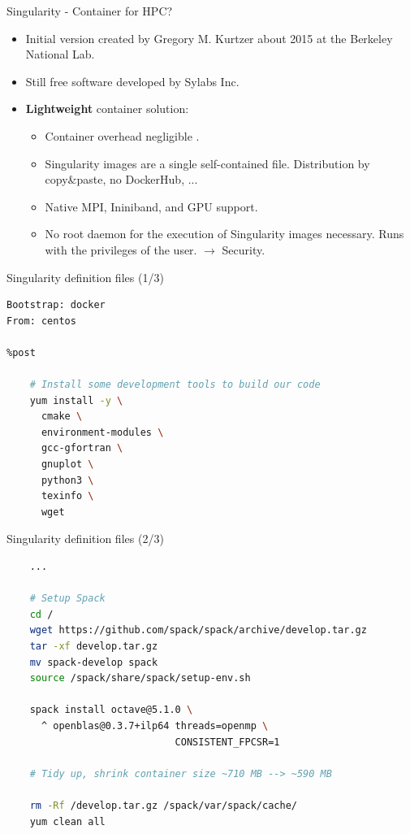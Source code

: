 \documentclass[xcolor=svgnames,xcolor=table,aspectratio=169]{beamer}
\begin{document}
\begin{frame}{Singularity \cite{Kurtzer2017} - Container for HPC?}
\begin{itemize}
\itemsep1em
\item
Initial version created by Gregory M. Kurtzer about 2015
at the Berkeley National Lab.

\item
Still free software developed by Sylabs Inc.

\item
\textbf{Lightweight} container solution:

\begin{itemize}
\itemsep1em
\item
Container overhead negligible
\cite{Herbein2016,Le2017,Younge2017,Shudler2019}.

\item
Singularity images are a single self-contained file.
Distribution by copy\&paste, no DockerHub, ...

\item
Native MPI, Ininiband, and GPU support.

\item
No root daemon for the execution of Singularity images necessary.
Runs with the privileges of the user.
$\rightarrow$ Security.
\end{itemize}
\end{itemize}
\end{frame}



\begin{frame}[fragile]{Singularity definition files (1/3)}
\begin{lstlisting}[xleftmargin=5em,language=Bash]
Bootstrap: docker
From: centos

%post

    # Install some development tools to build our code
    yum install -y \
      cmake \
      environment-modules \
      gcc-gfortran \
      gnuplot \
      python3 \
      texinfo \
      wget
\end{lstlisting}
\end{frame}



\begin{frame}[fragile]{Singularity definition files (2/3)}
\begin{lstlisting}[xleftmargin=5em,language=Bash]
%post
    ...

    # Setup Spack
    cd /
    wget https://github.com/spack/spack/archive/develop.tar.gz
    tar -xf develop.tar.gz
    mv spack-develop spack
    source /spack/share/spack/setup-env.sh

    spack install octave@5.1.0 \
      ^ openblas@0.3.7+ilp64 threads=openmp \
                             CONSISTENT_FPCSR=1

    # Tidy up, shrink container size ~710 MB --> ~590 MB
    
    rm -Rf /develop.tar.gz /spack/var/spack/cache/
    yum clean all
\end{lstlisting}
\end{frame}
\end{document}
